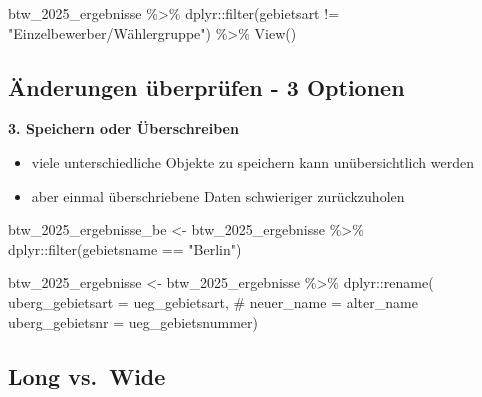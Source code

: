 \documentclass[
  custompaper,
  DIV=11,
  numbers=noendperiod]{scrartcl}
\newenvironment{Shaded}{\begin{snugshade}}{\end{snugshade}}
\newcommand{\AttributeTok}[1]{\textcolor[rgb]{0.40,0.45,0.13}{#1}}
\newcommand{\CommentTok}[1]{\textcolor[rgb]{0.37,0.37,0.37}{#1}}
\newcommand{\FunctionTok}[1]{\textcolor[rgb]{0.28,0.35,0.67}{#1}}
\newcommand{\NormalTok}[1]{\textcolor[rgb]{0.00,0.23,0.31}{#1}}
\newcommand{\OtherTok}[1]{\textcolor[rgb]{0.00,0.23,0.31}{#1}}
\newcommand{\SpecialCharTok}[1]{\textcolor[rgb]{0.37,0.37,0.37}{#1}}
\newcommand{\StringTok}[1]{\textcolor[rgb]{0.13,0.47,0.30}{#1}}
\begin{document}
\begin{Shaded}
\begin{Highlighting}[]
\NormalTok{btw\_2025\_ergebnisse }\SpecialCharTok{\%\textgreater{}\%}
\NormalTok{  dplyr}\SpecialCharTok{::}\FunctionTok{filter}\NormalTok{(gebietsart }\SpecialCharTok{!=} \StringTok{"Einzelbewerber/Wählergruppe"}\NormalTok{) }\SpecialCharTok{\%\textgreater{}\%}
  \FunctionTok{View}\NormalTok{()}
\end{Highlighting}
\end{Shaded}

\subsection{Änderungen überprüfen - 3
Optionen}\label{uxe4nderungen-uxfcberpruxfcfen---3-optionen-2}

\textbf{3. Speichern oder Überschreiben}

\begin{itemize}
\item
  viele unterschiedliche Objekte zu speichern kann unübersichtlich
  werden
\item
  aber einmal überschriebene Daten schwieriger zurückzuholen
\end{itemize}

\begin{Shaded}
\begin{Highlighting}[]
\NormalTok{btw\_2025\_ergebnisse\_be }\OtherTok{\textless{}{-}}\NormalTok{  btw\_2025\_ergebnisse }\SpecialCharTok{\%\textgreater{}\%}
\NormalTok{  dplyr}\SpecialCharTok{::}\FunctionTok{filter}\NormalTok{(gebietsname }\SpecialCharTok{==} \StringTok{"Berlin"}\NormalTok{)}
\end{Highlighting}
\end{Shaded}

\begin{Shaded}
\begin{Highlighting}[]
\NormalTok{btw\_2025\_ergebnisse }\OtherTok{\textless{}{-}}\NormalTok{ btw\_2025\_ergebnisse }\SpecialCharTok{\%\textgreater{}\%}
\NormalTok{  dplyr}\SpecialCharTok{::}\FunctionTok{rename}\NormalTok{(}
    \AttributeTok{uberg\_gebietsart =}\NormalTok{ ueg\_gebietsart, }\CommentTok{\# neuer\_name = alter\_name}
    \AttributeTok{uberg\_gebietsnr =}\NormalTok{ ueg\_gebietsnummer)}
\end{Highlighting}
\end{Shaded}

\subsection{Long vs.~Wide}\label{long-vs.-wide}
\end{document}
